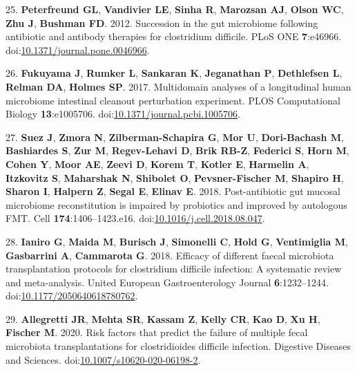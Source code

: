 \documentclass[11pt,]{article}
\newlength{\cslhangindent}
\newenvironment{cslreferences}%
  {\setlength{\parindent}{0pt}%
  \everypar{\setlength{\hangindent}{\cslhangindent}}\ignorespaces}%
  {\par}
\begin{document}
\begin{cslreferences}
\leavevmode\hypertarget{ref-peterfreund2012}{}%
25. \textbf{Peterfreund GL}, \textbf{Vandivier LE}, \textbf{Sinha R},
\textbf{Marozsan AJ}, \textbf{Olson WC}, \textbf{Zhu J}, \textbf{Bushman
FD}. 2012. Succession in the gut microbiome following antibiotic and
antibody therapies for clostridium difficile. PLoS ONE
\textbf{7}:e46966.
doi:\href{https://doi.org/10.1371/journal.pone.0046966}{10.1371/journal.pone.0046966}.

\leavevmode\hypertarget{ref-fukuyama2017}{}%
26. \textbf{Fukuyama J}, \textbf{Rumker L}, \textbf{Sankaran K},
\textbf{Jeganathan P}, \textbf{Dethlefsen L}, \textbf{Relman DA},
\textbf{Holmes SP}. 2017. Multidomain analyses of a longitudinal human
microbiome intestinal cleanout perturbation experiment. PLOS
Computational Biology \textbf{13}:e1005706.
doi:\href{https://doi.org/10.1371/journal.pcbi.1005706}{10.1371/journal.pcbi.1005706}.

\leavevmode\hypertarget{ref-suez2018}{}%
27. \textbf{Suez J}, \textbf{Zmora N}, \textbf{Zilberman-Schapira G},
\textbf{Mor U}, \textbf{Dori-Bachash M}, \textbf{Bashiardes S},
\textbf{Zur M}, \textbf{Regev-Lehavi D}, \textbf{Brik RB-Z},
\textbf{Federici S}, \textbf{Horn M}, \textbf{Cohen Y}, \textbf{Moor
AE}, \textbf{Zeevi D}, \textbf{Korem T}, \textbf{Kotler E},
\textbf{Harmelin A}, \textbf{Itzkovitz S}, \textbf{Maharshak N},
\textbf{Shibolet O}, \textbf{Pevsner-Fischer M}, \textbf{Shapiro H},
\textbf{Sharon I}, \textbf{Halpern Z}, \textbf{Segal E}, \textbf{Elinav
E}. 2018. Post-antibiotic gut mucosal microbiome reconstitution is
impaired by probiotics and improved by autologous FMT. Cell
\textbf{174}:1406--1423.e16.
doi:\href{https://doi.org/10.1016/j.cell.2018.08.047}{10.1016/j.cell.2018.08.047}.

\leavevmode\hypertarget{ref-ianiro2018}{}%
28. \textbf{Ianiro G}, \textbf{Maida M}, \textbf{Burisch J},
\textbf{Simonelli C}, \textbf{Hold G}, \textbf{Ventimiglia M},
\textbf{Gasbarrini A}, \textbf{Cammarota G}. 2018. Efficacy of different
faecal microbiota transplantation protocols for clostridium difficile
infection: A systematic review and meta-analysis. United European
Gastroenterology Journal \textbf{6}:1232--1244.
doi:\href{https://doi.org/10.1177/2050640618780762}{10.1177/2050640618780762}.

\leavevmode\hypertarget{ref-allegretti2020}{}%
29. \textbf{Allegretti JR}, \textbf{Mehta SR}, \textbf{Kassam Z},
\textbf{Kelly CR}, \textbf{Kao D}, \textbf{Xu H}, \textbf{Fischer M}.
2020. Risk factors that predict the failure of multiple fecal microbiota
transplantations for clostridioides difficile infection. Digestive
Diseases and Sciences.
doi:\href{https://doi.org/10.1007/s10620-020-06198-2}{10.1007/s10620-020-06198-2}.


\end{cslreferences}
\end{document}
